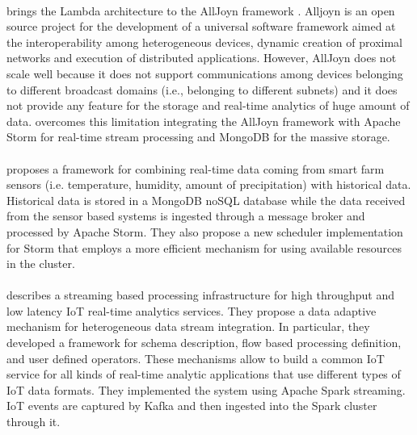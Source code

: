 \paragraph{}
\cite{alljoynlambda} brings the Lambda architecture to the AllJoyn framework \cite{alljoynframeworkonline}. Alljoyn is an open source project for the development of a universal software framework aimed at the interoperability among heterogeneous devices, dynamic creation of proximal networks and execution of distributed applications. However, AllJoyn does not scale well because it does not support communications among devices belonging to different broadcast domains (i.e., belonging to different subnets) and it does not provide any feature for the storage and real-time analytics of huge amount of data. \cite{alljoynlambda} overcomes this limitation integrating the AllJoyn framework with Apache Storm for real-time stream processing and MongoDB for the massive storage.

\paragraph{}
\cite{realtimeheterogeneousdata} proposes a framework for combining real-time data coming from smart farm sensors (i.e. temperature, humidity, amount of precipitation) with historical data. Historical data is stored in a MongoDB noSQL database while the data received from the sensor based systems is ingested through a message broker and processed by Apache Storm. They also propose a new scheduler implementation for Storm that employs a more efficient mechanism for using available resources in the cluster.

\paragraph{}
\cite{adaptiveiotapplications} describes a streaming based processing infrastructure for high throughput and low latency IoT real-time analytics services. They propose a data adaptive mechanism for heterogeneous data stream integration. In particular, they developed a framework for schema description, flow based processing definition, and user defined operators. These mechanisms allow to build a common IoT service for all kinds of real-time analytic applications that use different types of IoT data formats. They implemented the system using Apache Spark streaming. IoT events are captured by Kafka and then ingested into the Spark cluster through it.

